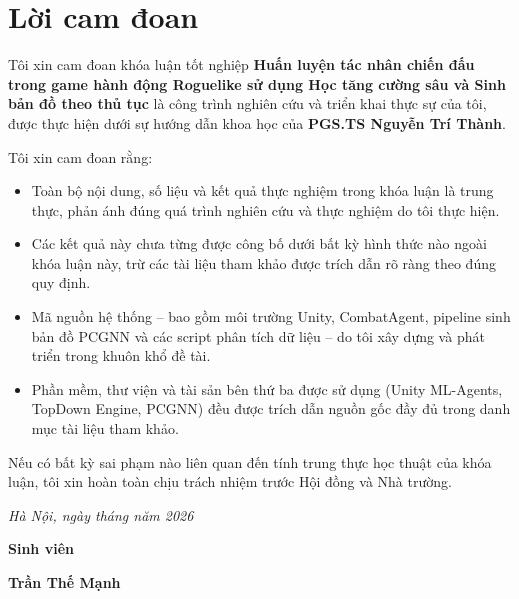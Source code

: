 \clearpage
{}

\chapter*{Lời cam đoan}

Tôi xin cam đoan khóa luận tốt nghiệp \textbf{Huấn luyện tác nhân chiến đấu trong game hành động Roguelike sử dụng Học tăng cường sâu và Sinh bản đồ theo thủ tục} là công trình nghiên cứu và triển khai thực sự của tôi, được thực hiện dưới sự hướng dẫn khoa học của \textbf{PGS.TS Nguyễn Trí Thành}.

Tôi xin cam đoan rằng:

\begin{itemize}
    \item Toàn bộ nội dung, số liệu và kết quả thực nghiệm trong khóa luận là trung thực, phản ánh đúng quá trình nghiên cứu và thực nghiệm do tôi thực hiện.
    \item Các kết quả này chưa từng được công bố dưới bất kỳ hình thức nào ngoài khóa luận này, trừ các tài liệu tham khảo được trích dẫn rõ ràng theo đúng quy định.
    \item Mã nguồn hệ thống -- bao gồm môi trường Unity, CombatAgent, pipeline sinh bản đồ PCGNN và các script phân tích dữ liệu -- do tôi xây dựng và phát triển trong khuôn khổ đề tài.
    \item Phần mềm, thư viện và tài sản bên thứ ba được sử dụng (Unity ML-Agents, TopDown Engine, PCGNN) đều được trích dẫn nguồn gốc đầy đủ trong danh mục tài liệu tham khảo.
\end{itemize}

Nếu có bất kỳ sai phạm nào liên quan đến tính trung thực học thuật của khóa luận, tôi xin hoàn toàn chịu trách nhiệm trước Hội đồng và Nhà trường.

\vspace{1cm}
\hspace{6cm}\textit{Hà Nội, ngày \hspace{0.5cm} tháng \hspace{0.5cm} năm 2026}

\vspace{0.5cm}
\hspace{9.4cm}\textbf{Sinh viên}

\vspace{2.5cm}
\hspace{8.6cm}\textbf{Trần Thế Mạnh}
